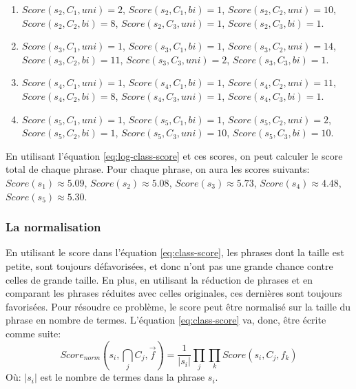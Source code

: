 \documentclass[a4paper,12pt,oneside]{../use/ESIthesis}
\begin{document}
\begin{kexp}
\begin{enumerate}
\item $ Score(s_2 , C_1 , uni ) = 2 $, $ Score(s_2 , C_1 , bi ) = 1 $, 
$ Score(s_2 , C_2 , uni ) = 10 $, $ Score(s_2 , C_2 , bi ) = 8 $, 
$ Score(s_2 , C_3 , uni ) = 1 $, $ Score(s_2 , C_3 , bi ) = 1 $.

\item $ Score(s_3 , C_1 , uni ) = 1 $, $ Score(s_3 , C_1 , bi ) = 1 $, 
$ Score(s_3 , C_2 , uni ) = 14 $, $ Score(s_3 , C_2 , bi ) = 11 $, 
$ Score(s_3 , C_3 , uni ) = 2 $, $ Score(s_3 , C_3 , bi ) = 1 $.

\item $ Score(s_4 , C_1 , uni ) = 1 $, $ Score(s_4 , C_1 , bi ) = 1 $, 
$ Score(s_4 , C_2 , uni ) = 11 $, $ Score(s_4 , C_2 , bi ) = 8 $, 
$ Score(s_4 , C_3 , uni ) = 1 $, $ Score(s_4 , C_3 , bi ) = 1 $.

\item $ Score(s_5 , C_1 , uni ) = 1 $, $ Score(s_5 , C_1 , bi ) = 1 $, 
$ Score(s_5 , C_2 , uni ) = 2 $, $ Score(s_5 , C_2 , bi ) = 1 $, 
$ Score(s_5 , C_3 , uni ) = 10 $, $ Score(s_5 , C_3 , bi ) = 10 $.

\end{enumerate}

En utilisant l'équation \ref{eq:log-class-score} et ces scores, on peut calculer le score total de chaque phrase. 
Pour chaque phrase, on aura les scores suivants: $ Score(s_1) \approx 5.09 $, $ Score(s_2) \approx 5.08 $, $ Score(s_3) \approx 5.73 $, $ Score(s_4) \approx 4.48 $, $ Score(s_5) \approx 5.30 $.
\end{kexp}

\subsubsection{La normalisation}

En utilisant le score dans l'équation \ref{eq:class-score}, les phrases dont la taille est petite, sont toujours défavorisées, et donc n'ont pas une grande chance contre celles de grande taille. 
En plus, en utilisant la réduction de phrases et en comparant les phrases réduites avec celles originales, ces dernières sont toujours favorisées.
Pour résoudre ce problème, le score peut être normalisé sur la taille du phrase en nombre de termes. 
L'équation \ref{eq:class-score} va, donc, être écrite comme suite:
\begin{equation}
\label{eq:score-norm}
Score_{norm}(s_i , \bigcap_{j} C_j , \overrightarrow{f}) = 
\frac{1}{|s_i|}
\prod_{j} \prod_{k} Score(s_i , C_j , f_k )
\end{equation}
Où: $ |s_i| $ est le nombre de termes dans la phrase $ s_i $.
\end{document}
